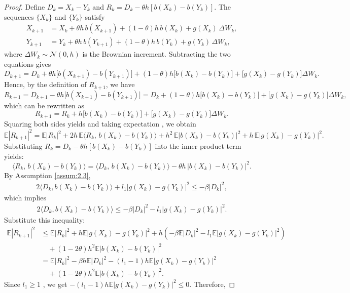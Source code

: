 \documentclass{article}
\begin{document}
\begin{proof}
Define $D_k = X_k - Y_k$ and $R_k = D_k - \theta h[b(X_k) - b(Y_k)]$. The sequences $\{X_k\}$ and $\{Y_k\}$ satisfy
\begin{align*}
	X_{k+1} &= X_k + \theta h\, b(X_{k+1}) + (1-\theta)h\, b(X_k) + g(X_k)\,\Delta W_k, \\
	Y_{k+1} &= Y_k + \theta h\, b(Y_{k+1}) + (1-\theta)h\, b(Y_k) + g(Y_k)\,\Delta W_k,
\end{align*}
where $\Delta W_k \sim \mathcal{N}(0,h)$ is the Brownian increment. Subtracting the two equations gives
\[
D_{k+1} = D_k + \theta h\big[b(X_{k+1})-b(Y_{k+1})\big] + (1-\theta)h\big[b(X_k)-b(Y_k)\big] + \big[g(X_k)-g(Y_k)\big]\Delta W_k.
\]
Hence, by the definition of $R_{k+1}$, we have
\[
R_{k+1} = D_{k+1} - \theta h\big[b(X_{k+1})-b(Y_{k+1})\big] = D_k + (1-\theta)h\big[b(X_k)-b(Y_k)\big] + \big[g(X_k)-g(Y_k)\big]\Delta W_k,
\]
which can be rewritten as
\[
R_{k+1} = R_k + h\big[b(X_k)-b(Y_k)\big] + \big[g(X_k)-g(Y_k)\big]\Delta W_k.
\]
Squaring both sides yields and taking expectation , we obtain
\[
\mathbb{E}|R_{k+1}|^2 = \mathbb{E}|R_k|^2 + 2h\,\mathbb{E}\langle R_k,\, b(X_k)-b(Y_k)\rangle + h^2\,\mathbb{E}|b(X_k)-b(Y_k)|^2 + h\,\mathbb{E}|g(X_k)-g(Y_k)|^2.
\]
Substituting $R_k = D_k - \theta h[b(X_k)-b(Y_k)]$ into the inner product term yields:
\[
\langle R_k,\, b(X_k)-b(Y_k)\rangle = \langle D_k,\, b(X_k)-b(Y_k)\rangle - \theta h\,|b(X_k)-b(Y_k)|^2.
\]
By Assumption \ref{assum:2.3},
\begin{align*}
	2\langle D_k, b(X_k) - b(Y_k) \rangle + l_1 |g(X_k) - g(Y_k)|^2 \leq -\beta |D_k|^2,
\end{align*}
which implies
\begin{align*}
	2\langle D_k, b(X_k) - b(Y_k) \rangle \leq -\beta |D_k|^2 - l_1 |g(X_k) - g(Y_k)|^2.
\end{align*}
Substitute this inequality:
\begin{align*}
	\mathbb{E}|R_{k+1}|^2 &\leq \mathbb{E}|R_k|^2 + h\mathbb{E}|g(X_k) - g(Y_k)|^2 + h\left(-\beta\mathbb{E}|D_k|^2 - l_1\mathbb{E}|g(X_k) - g(Y_k)|^2\right) \\
	&\quad + (1-2\theta)h^2\mathbb{E}|b(X_k) - b(Y_k)|^2 \\
	&= \mathbb{E}|R_k|^2 - \beta h\mathbb{E}|D_k|^2 - (l_1-1)h\mathbb{E}|g(X_k) - g(Y_k)|^2 \\
	&\quad + (1-2\theta)h^2\mathbb{E}|b(X_k) - b(Y_k)|^2.
\end{align*}
Since $l_1 \geq 1$ , we get $-(l_1-1)h\mathbb{E}|g(X_k) - g(Y_k)|^2 \leq 0$. 
Therefore,

\end{proof}
\end{document}
